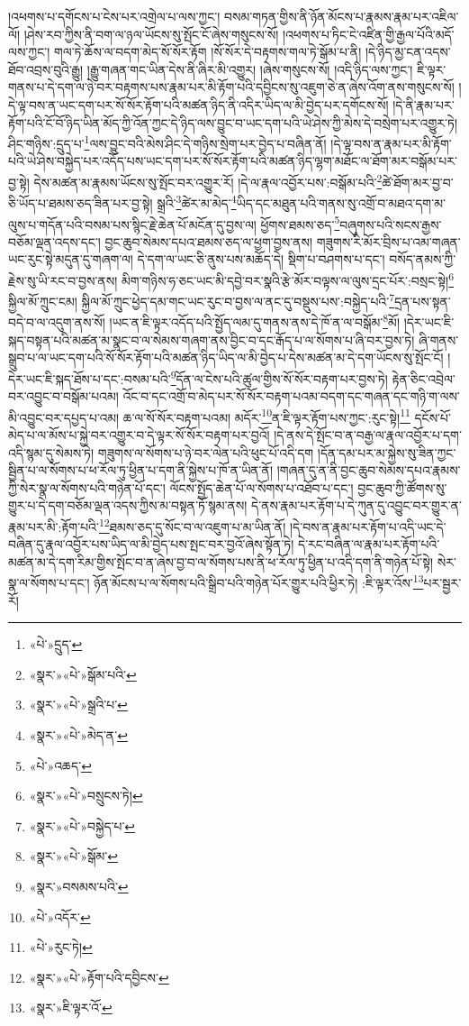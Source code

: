 །འཕགས་པ་དགོངས་པ་ངེས་པར་འགྲེལ་པ་ལས་ཀྱང་། བསམ་གཏན་གྱིས་ནི་ཉོན་མོངས་པ་རྣམས་རྣམ་པར་འཇིལ་ལོ། །ཤེས་རབ་ཀྱིས་ནི་བག་ལ་ཉལ་ཡོངས་སུ་སྤོང་ངོ་ཞེས་གསུངས་སོ། །འཕགས་པ་ཏིང་ངེ་འཛིན་གྱི་རྒྱལ་པོའི་མདོ་ལས་ཀྱང་། གལ་ཏེ་ཆོས་ལ་བདག་མེད་སོ་སོར་རྟོག །སོ་སོར་དེ་བརྟགས་གལ་ཏེ་སྒོམ་པ་ནི། །དེ་ཉིད་མྱ་ངན་འདས་ཐོབ་འབྲས་བུའི་རྒྱུ། །རྒྱུ་གཞན་གང་ཡིན་དེས་ནི་ཞིར་མི་འགྱུར། །ཞེས་གསུངས་སོ། །འདི་ཉིད་ལས་ཀྱང་། ཇི་ལྟར་གནས་པ་དེ་དག་ལ་ཉེ་བར་བརྟགས་པས་རྣམ་པར་མི་རྟོག་པའི་དབྱིངས་སུ་འཇུག་ཅེ་ན་ཞེས་འོག་ནས་གསུངས་སོ། །དེ་ལྟ་བས་ན་ཡང་དག་པར་སོ་སོར་རྟོག་པའི་མཚན་ཉིད་ནི་འདིར་ཡིད་ལ་མི་བྱེད་པར་དགོངས་སོ། །དེ་ནི་རྣམ་པར་རྟོག་པའི་ངོ་བོ་ཉིད་ཡིན་མོད་ཀྱི་འོན་ཀྱང་དེ་ཉིད་ལས་བྱུང་བ་ཡང་དག་པའི་ཡེ་ཤེས་ཀྱི་མེས་དེ་བསྲེག་པར་འགྱུར་ཏེ། ཤིང་གཉིས་:དྲུད་པ་\footnote{«པེ་»དྲུད་}ལས་བྱུང་བའི་མེས་ཤིང་དེ་གཉིས་སྲེག་པར་བྱེད་པ་བཞིན་ནོ། །དེ་ལྟ་བས་ན་རྣམ་པར་མི་རྟོག་པའི་ཡེ་ཤེས་བསྐྱེད་པར་འདོད་པས་ཡང་དག་པར་སོ་སོར་རྟོག་པའི་མཚན་ཉིད་ལྷག་མཐོང་ལ་ཐོག་མར་བསྒོམ་པར་བྱ་སྟེ། དེས་མཚན་མ་རྣམས་ཡོངས་སུ་སྤོང་བར་འགྱུར་རོ། །དེ་ལ་རྣལ་འབྱོར་པས་:བསྒོམ་པའི་\footnote{«སྣར་»«པེ་»སྒོམ་པའི་}ཚེ་ཐོག་མར་བྱ་བ་ཅི་ཡོད་པ་ཐམས་ཅད་ཟིན་པར་བྱ་སྟེ། སྒྲའི་\footnote{«སྣར་»«པེ་»སྒྲའི་པ་}ཚེར་མ་མེད་\footnote{«སྣར་»«པེ་»མེད་ན་}ཡིད་དང་མཐུན་པའི་གནས་སུ་འགྲོ་བ་མཐའ་དག་མ་ལུས་པ་གདོན་པའི་བསམ་པས་སྙིང་རྗེ་ཆེན་པོ་མངོན་དུ་བྱས་ལ། ཕྱོགས་ཐམས་ཅད་\footnote{«པེ་»འཆད་}བཞུགས་པའི་སངས་རྒྱས་བཅོམ་ལྡན་འདས་དང་། བྱང་ཆུབ་སེམས་དཔའ་ཐམས་ཅད་ལ་ཕྱག་བྱས་ནས། གཟུགས་རི་མོར་བྲིས་པ་འམ་གཞན་ཡང་རུང་སྟེ་མདུན་དུ་གཞག་ལ། དེ་དག་ལ་ཡང་ཅི་ནུས་པས་མཆོད་དེ། སྡིག་པ་བཤགས་པ་དང་། བསོད་ནམས་ཀྱི་རྗེས་སུ་ཡི་རང་བ་བྱས་ནས། མིག་གཉིས་ཧ་ཅང་ཡང་མི་དབྱེ་བར་སྣའི་རྩེ་མོར་བལྟས་ལ་ལུས་དྲང་པོར་:བསྲང་སྟེ།\footnote{«སྣར་»«པེ་»བསྲུངས་ཏེ།} སྐྱིལ་མོ་ཀྲུང་ངམ། སྐྱིལ་མོ་ཀྲུང་ཕྱེད་དམ་གང་ཡང་རུང་བ་བྱས་ལ་ནང་དུ་བསྡུས་པས་:བསྐྱེད་པའི་\footnote{«སྣར་»«པེ་»བསྐྱེད་པ་}དྲན་པས་སྟན་བདེ་བ་ལ་འདུག་ནས་སོ། །ཡང་ན་ཇི་ལྟར་འདོད་པའི་སྤྱོད་ལམ་དུ་གནས་ནས་དེ་ཁོ་ན་ལ་བསྒོམ་\footnote{«སྣར་»«པེ་»སྒོམ་}མོ། །དེར་ཡང་ཇི་སྐད་བསྟན་པའི་མཚན་མ་སྣང་བ་ལ་སེམས་གཞག་ནས་བྱིང་བ་དང་རྒོད་པ་ལ་སོགས་པ་ཞི་བར་བྱས་ཏེ། ཞི་གནས་སྒྲུབ་པ་ལ་ཡང་དག་པའི་སོ་སོར་རྟོག་པའི་མཚན་ཉིད་ཡིད་ལ་མི་བྱེད་པ་དེས་མཚན་མ་དེ་དག་ཡོངས་སུ་སྤོང་ངོ། །དེར་ཡང་ཇི་སྐད་ཐོས་པ་དང་:བསམ་པའི་\footnote{«སྣར་»བསམས་པའི་}དོན་ལ་ངེས་པའི་ཚུལ་གྱིས་སོ་སོར་བརྟག་པར་བྱས་ཏེ། རྟེན་ཅིང་འབྲེལ་བར་འབྱུང་བ་བསྒོམ་པའམ། འོང་བ་དང་འགྲོ་བ་མེད་པར་སོ་སོར་བརྟག་པའམ་བདག་དང་གཞན་དང་གཉི་ག་ལས་མི་འབྱུང་བར་དཔྱད་པ་འམ། ཆ་ལ་སོ་སོར་བརྟག་པའམ། མདོར་\footnote{«པེ་»འདོར་}ན་ཇི་ལྟར་རྟོག་པས་ཀྱང་:རུང་སྟེ།\footnote{«པེ་»རུང་ཏེ།} དངོས་པོ་མེད་པ་ལ་མོས་པ་སྐྱེ་བར་འགྱུར་བ་དེ་ལྟར་སོ་སོར་བརྟག་པར་བྱའོ། །དེ་ནས་དེ་སྤོང་བ་ན་བརྒྱ་ལ་རྣལ་འབྱོར་པ་དག་འདི་སྙམ་དུ་སེམས་ཏེ། གཟུགས་ལ་སོགས་པ་ཉེ་བར་ལེན་པའི་ཕུང་པོ་འདི་དག །དོན་དམ་པར་མ་སྐྱེས་སུ་ཟིན་ཀྱང་སྦྱིན་པ་ལ་སོགས་པ་ཕ་རོལ་ཏུ་ཕྱིན་པ་དག་ནི་སྐྱེས་པ་ཁོ་ན་ཡིན་ནོ། །གཞན་དུ་ན་ནི་བྱང་ཆུབ་སེམས་དཔའ་རྣམས་ཀྱི་སེར་སྣ་ལ་སོགས་པའི་གཉེན་པོ་དང་། ལོངས་སྤྱོད་ཆེན་པོ་ལ་སོགས་པ་འཐོབ་པ་དང་། བྱང་ཆུབ་ཀྱི་ཚོགས་སུ་གྱུར་པ་དེ་དག་བཅོམ་ལྡན་འདས་ཀྱིས་མ་བསྟན་ཏོ་སྙམ་ནས། དེ་ནས་རྣམ་པར་རྟོག་པ་དེ་ཀུན་དུ་འབྱུང་བར་གྱུར་ན་རྣམ་པར་མི་:རྟོག་པའི་\footnote{«སྣར་»«པེ་»རྟོག་པའི་དབྱིངས་}ཐམས་ཅད་དུ་སོང་བ་ལ་འཇུག་པ་མ་ཡིན་ནོ། །དེ་བས་ན་རྣམ་པར་རྟོག་པ་འདི་ཡང་དེ་བཞིན་དུ་རྣལ་འབྱོར་པས་ཡིད་ལ་མི་བྱེད་པས་སྤང་བར་བྱའོ་ཞེས་སྟོན་ཏེ། དེ་རང་བཞིན་ལ་རྣམ་པར་རྟོག་པའི་མཚན་མ་དེ་དག་རིམ་གྱིས་སྤོང་བ་ན་ཞེས་བྱ་བ་ལ་སོགས་པས་ནི་ཕ་རོལ་ཏུ་ཕྱིན་པ་འདི་དག་ནི་གཉེན་པོ་སྟེ། སེར་སྣ་ལ་སོགས་པ་དང་། ཉོན་མོངས་པ་ལ་སོགས་པའི་སྒྲིབ་པའི་གཉེན་པོར་གྱུར་པའི་ཕྱིར་ཏེ། :ཇི་ལྟར་འོས་\footnote{«སྣར་»ཇི་ལྟར་འོ་}པར་སྦྱར་རོ། 